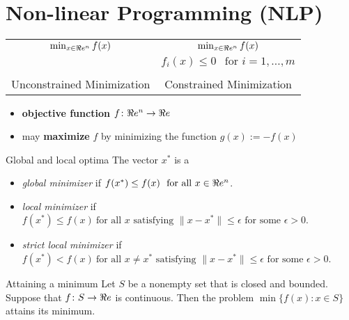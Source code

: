 

%
%
\chapter{Non-linear Programming (NLP)}
\begin{center}
\begin{tabular}{|c|c|}
\hline
$
\min_{x \in \Re e^n} f(x)
$
& 
$\min_{x \in \Re e^n} f(x)$ \\
&$ f_i(x) \leq 0  \ \ \text{ for } i=1, \dots, m$\\
&\\
Unconstrained Minimization & Constrained Minimization\\
\hline
\end{tabular}
\end{center}

\begin{itemize}
\item \textbf{objective function} $f \colon \Re e^n \to \Re e$
\item may \textbf{maximize} $f$ by minimizing the function $g(x) := -f(x)$
\end{itemize}


\begin{definition}{}{Global and local optima}
The vector $x^*$ is a
\begin{itemize}
\item  \emph{global minimizer} if $f(x^*) \leq f(x) \ \mbox{ for all } x \in \Re e^n$.
\item  \emph{local minimizer} if $f(x^*) \leq f(x) \ \text{for all } x \text{ satisfying } \| x- x^*\| \leq \epsilon \text{ for some } \epsilon > 0$.
\item \emph{strict local minimizer} if $f(x^*) < f(x) \ \text{for all } x \neq x^* \text{ satisfying } \| x- x^*\| \leq \epsilon \text{ for some } \epsilon > 0$.
\end{itemize}
\end{definition}

\begin{center}
\end{center}


\begin{theorem}{Attaining a minimum}{}
Let $S$ be a nonempty set that is closed and bounded.  Suppose that $f \colon S \to \Re e$ is continuous.  Then the problem $\min\{ f(x) : x \in S\}$ attains its minimum.
\end{theorem}


